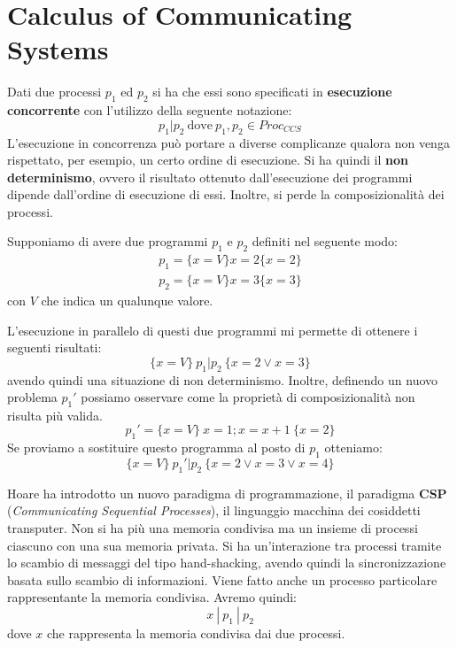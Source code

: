 \chapter{Calculus of Communicating Systems}
Dati due processi $p_1$ ed $p_2$ si ha che essi sono specificati in
\textbf{esecuzione concorrente} con l'utilizzo della seguente notazione:
\begin{equation}
    p_1 | p_2 \ \text{dove} \ p_1, p_2 \in Proc_{CCS}
\end{equation}
L'esecuzione in concorrenza può portare a diverse complicanze qualora non venga
rispettato, per esempio, un certo ordine di esecuzione. Si ha quindi il
\textbf{non determinismo}, ovvero il risultato ottenuto dall'esecuzione dei
programmi dipende dall'ordine di esecuzione di essi. Inoltre, si perde la
composizionalità dei processi.
\begin{esempio}
    Supponiamo di avere due programmi $p_1$ e $p_2$ definiti nel seguente
    modo:
    \begin{equation}
        \begin{aligned}
            p_1 =\{x = V\} x = 2 \{x = 2\} \\
            p_2 =\{x = V\} x = 3 \{x = 3\}
        \end{aligned}
    \end{equation}
    con $V$ che indica un qualunque valore.

    L'esecuzione in parallelo di questi due programmi mi permette di ottenere i
    seguenti risultati:
    \begin{equation}
        \{x = V\} \ p_1 | p_2 \ \{x = 2 \lor x = 3\}
    \end{equation}
    avendo quindi una situazione di non determinismo. Inoltre, definendo un nuovo
    problema $p_1'$ possiamo osservare come la proprietà di composizionalità non
    risulta più valida.
    \begin{equation}
        p_1' = \{x = V\} \ x = 1; x = x + 1 \ \{x = 2\}
    \end{equation}
    Se proviamo a sostituire questo programma al posto di $p_1$ otteniamo:
    \begin{equation}
        \{x = V\} \ p_1' | p_2 \ \{x = 2 \lor x = 3 \lor x = 4\}
    \end{equation}
\end{esempio}
Hoare ha introdotto un nuovo paradigma di programmazione, il paradigma \textbf{CSP}
(\textit{Communicating Sequential Processes}), il linguaggio macchina dei cosiddetti
transputer. Non si ha più una memoria condivisa ma un insieme di processi ciascuno
con una sua memoria privata. Si ha un'interazione tra processi tramite lo scambio
di messaggi del tipo hand-shacking, avendo quindi la sincronizzazione basata sullo scambio
di informazioni. Viene fatto anche un processo particolare rappresentante la memoria
condivisa. Avremo quindi:
\begin{equation}
    x \ | \ p_1 \ | \ p_2
\end{equation}
dove $x$ che rappresenta la memoria condivisa dai due processi.

